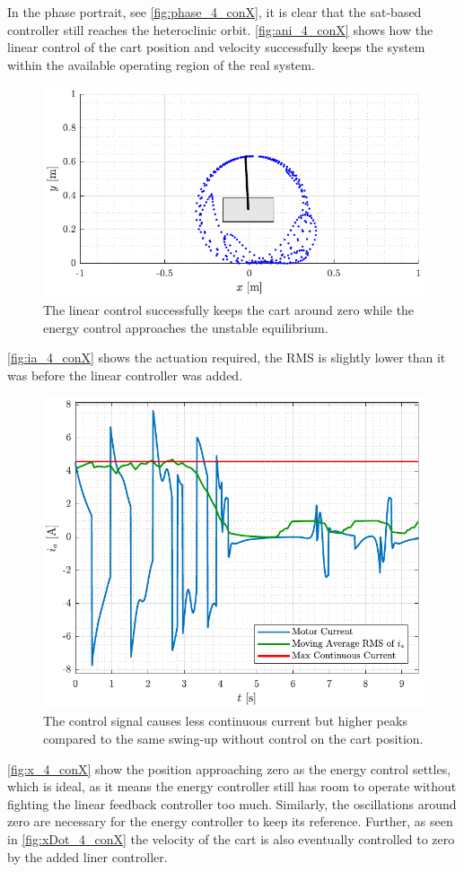 %
In the phase portrait, see \autoref{fig:phase_4_conX}, it is clear that the sat-based controller still reaches the heteroclinic orbit.
\autoref{fig:ani_4_conX} shows how the linear control of the cart position and velocity successfully keeps the system within the available operating region of the real system.
%
\begin{figure}[H]
  \includegraphics[width=.52\textwidth]{figures/ani_4_conX}
  \caption{The linear control successfully keeps the cart around zero while the energy control approaches the unstable equilibrium.}
  \label{fig:ani_4_conX}
\end{figure}
%
\autoref{fig:ia_4_conX} shows the actuation required, the RMS is slightly lower than it was before the linear controller was added.
%
\begin{figure}[H]
  \includegraphics[width=.52\textwidth]{figures/ia_4_conX}
  \caption{The control signal causes less continuous current but higher peaks compared to the same swing-up without control on the cart position.}
  \label{fig:ia_4_conX}
\end{figure}
%
\autoref{fig:x_4_conX} show the position approaching zero as the energy control settles, which is ideal, as it means the energy controller still has room to operate without fighting the linear feedback controller too much. Similarly, the oscillations around zero are necessary for the energy controller to keep its reference. Further, as seen in \autoref{fig:xDot_4_conX} the velocity of the cart is also eventually controlled to zero by the added liner controller.
